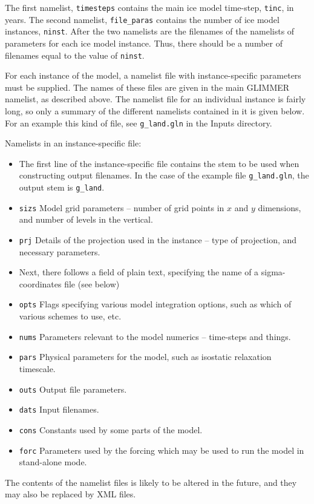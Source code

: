The first namelist, \texttt{timesteps} contains the main ice model time-step,
\texttt{tinc}, in years. The second namelist, \texttt{file\_paras} contains
the number of ice model instances, \texttt{ninst}. After the two namelists are
the filenames of the namelists of parameters for each ice model
instance. Thus, there should be a number of filenames equal to the value of \texttt{ninst}.

For each instance of the model, a namelist file with instance-specific
parameters must be supplied. The names of these files are given in the main
GLIMMER namelist, as described above. The namelist file for an individual
instance is fairly long, so only a summary of the different namelists
contained in it is given below. For an example this kind of file, see
\texttt{g\_land.gln} in the Inputs directory.

Namelists in an instance-specific file:
%
\begin{itemize}
\item The first line of the instance-specific file contains the stem to be
  used when constructing output filenames. In the case of the example file
  \texttt{g\_land.gln}, the output stem is \texttt{g\_land}.
\item \texttt{sizs} Model grid parameters -- number of grid points in $x$ and
  $y$ dimensions, and number of levels in the vertical.
\item \texttt{prj} Details of the projection used in the instance -- type of
  projection, and necessary parameters.
\item Next, there follows a field of plain text, specifying the name of a
  sigma-coordinates file (see below)
\item \texttt{opts} Flags specifying various model integration options, such
  as which of various schemes to use, etc.
\item \texttt{nums} Parameters relevant to the model numerics -- time-steps and
  things.
\item \texttt{pars} Physical parameters for the model, such as isostatic
  relaxation timescale.
\item \texttt{outs} Output file parameters.
\item \texttt{dats} Input filenames.
\item \texttt{cons} Constants used by some parts of the model.
\item \texttt{forc} Parameters used by the forcing which may be used to run
  the model in stand-alone mode.
\end{itemize}
%
The contents of the namelist files is likely to be altered in the future, and
they may also be replaced by XML files.
%
